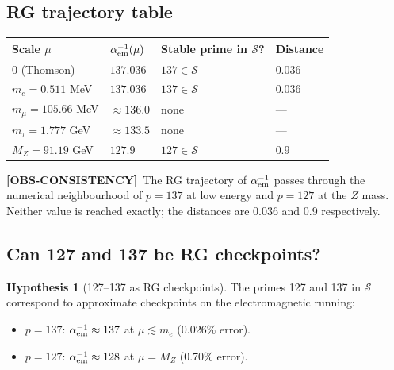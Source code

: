 \documentclass[12pt,a4paper]{article}
\theoremstyle{definition}
\newtheorem{hypothesis}[proposition]{Hypothesis}
\theoremstyle{remark}
\newcommand{\obs}{\textcolor{blue!45!black}{\textbf{[OBS-CONSISTENCY]}}}
\begin{document}
\subsection{RG trajectory table}

\begin{center}
\begin{tabular}{llll}
\toprule
Scale $\mu$ & $\alpha_{\rm em}^{-1}(\mu)$ & Stable prime in $\mathcal{S}$? & Distance \\
\midrule
$0$ (Thomson) & $137.036$ & $137 \in \mathcal{S}$ & $0.036$ \\
$m_e = 0.511$ MeV & $137.036$ & $137 \in \mathcal{S}$ & $0.036$ \\
$m_\mu = 105.66$ MeV & $\approx 136.0$ & none & — \\
$m_\tau = 1.777$ GeV & $\approx 133.5$ & none & — \\
$M_Z = 91.19$ GeV & $127.9$ & $127 \in \mathcal{S}$ & $0.9$ \\
\bottomrule
\end{tabular}
\end{center}

\begin{obsbox}
\obs\ The RG trajectory of $\alpha_{\rm em}^{-1}$ passes through the numerical
neighbourhood of $p = 137$ at low energy and $p = 127$ at the $Z$ mass.
Neither value is reached exactly; the distances are 0.036 and 0.9 respectively.
\end{obsbox}

\subsection{Can 127 and 137 be RG checkpoints?}

\begin{hypothesis}[127–137 as RG checkpoints]
The primes 127 and 137 in $\mathcal{S}$ correspond to approximate checkpoints
on the electromagnetic running:
\begin{itemize}
\item $p = 137$: $\alpha_{\rm em}^{-1} \approx 137$ at $\mu \lesssim m_e$ (0.026\% error).
\item $p = 127$: $\alpha_{\rm em}^{-1} \approx 128$ at $\mu = M_Z$ (0.70\% error).
\end{itemize}
\end{hypothesis}
\end{document}
